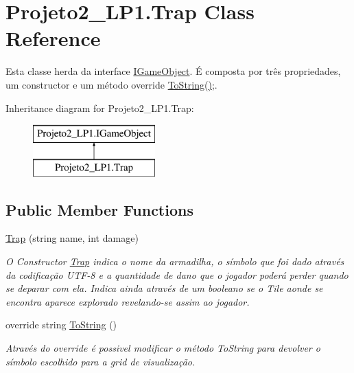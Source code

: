 \hypertarget{class_projeto2___l_p1_1_1_trap}{}\section{Projeto2\+\_\+\+L\+P1.\+Trap Class Reference}
\label{class_projeto2___l_p1_1_1_trap}


Esta classe herda da interface \mbox{\hyperlink{interface_projeto2___l_p1_1_1_i_game_object}{I\+Game\+Object}}. É composta por três propriedades, um constructor e um método override \mbox{\hyperlink{class_projeto2___l_p1_1_1_trap_a1abb25aa0b1f0b59026e9985a14875bf}{To\+String()}};.  


Inheritance diagram for Projeto2\+\_\+\+L\+P1.\+Trap\+:\begin{figure}[H]
\begin{center}
\leavevmode
\includegraphics[height=2.000000cm]{class_projeto2___l_p1_1_1_trap}
\end{center}
\end{figure}
\subsection*{Public Member Functions}
\begin{DoxyCompactItemize}
\item 
\mbox{\hyperlink{class_projeto2___l_p1_1_1_trap_a224953ea9e5f3050ecb5610c2609fe9d}{Trap}} (string name, int damage)
\begin{DoxyCompactList}\small\item\em O Constructor \mbox{\hyperlink{class_projeto2___l_p1_1_1_trap}{Trap}} indica o nome da armadilha, o símbolo que foi dado através da codificação U\+T\+F-\/8 e a quantidade de dano que o jogador poderá perder quando se deparar com ela. Indica ainda através de um booleano se o Tile aonde se encontra aparece explorado revelando-\/se assim ao jogador. \end{DoxyCompactList}\item 
override string \mbox{\hyperlink{class_projeto2___l_p1_1_1_trap_a1abb25aa0b1f0b59026e9985a14875bf}{To\+String}} ()
\begin{DoxyCompactList}\small\item\em Através do override é possivel modificar o método To\+String para devolver o símbolo escolhido para a grid de visualização. \end{DoxyCompactList}\end{DoxyCompactItemize}
